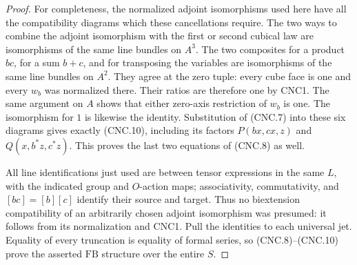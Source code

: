 \documentclass[11pt,a4paper]{article}
\numberwithin{equation}{section}
\theoremstyle{remark}\newtheorem{remark}[theorem]{Remark}
\begin{document}
\begin{proof}
For completeness, the normalized adjoint isomorphisms used here have
all the compatibility diagrams which these cancellations require.
The two ways to combine the adjoint isomorphism with the first or
second cubical law are isomorphisms of the same line bundles on
\(A^3\).  The two composites for a product \(bc\), for a sum
\(b+c\), and for transposing the variables are isomorphisms of
the same line bundles on \(A^2\).  They agree at the zero tuple:
every cube face is one and every \(w_b\) was normalized there.
Their ratios are therefore one by CNC1.  The same argument on \(A\)
shows that either zero-axis restriction of \(w_b\) is one.  The
isomorphism for \(1\) is likewise the identity.  Substitution of
(CNC.7) into these six diagrams gives exactly (CNC.10), including its
factors \(P(bx,cx,z)\) and \(Q(x,b^*z,c^*z)\).
This proves the last two equations of (CNC.8) as well.

All line identifications just used are between tensor expressions in
the same \(L\), with the indicated group and \(O\)-action maps;
associativity, commutativity, and \([bc]=[b][c]\) identify their
source and target.  Thus no biextension compatibility of an arbitrarily
chosen adjoint isomorphism was presumed: it follows from its
normalization and CNC1.  Pull the identities to each universal jet.
Equality of every truncation is equality of formal series, so
(CNC.8)--(CNC.10) prove the asserted \(\mathrm{FB}\) structure
over the entire \(S\).
\end{proof}

\end{document}
